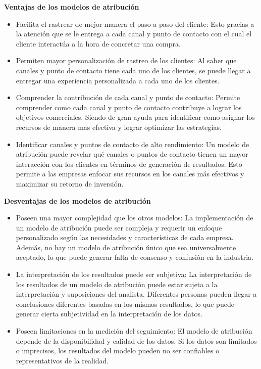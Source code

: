 \textbf{Ventajas de los modelos de atribución}

\begin{itemize}
\item Facilita el rastrear de mejor manera el paso a paso del cliente: Esto gracias a la atención que se le entrega a cada canal y punto de contacto con el cual el cliente interactúa a la hora de concretar una compra.
\item Permiten mayor personalización de rastreo de los clientes: Al saber que canales y punto de contacto tiene cada uno de los clientes, se puede llegar a entregar una experiencia personalizada a cada uno de los clientes.
\item Comprender la contribución de cada canal y punto de contacto: Permite comprender como cada canal y punto de contacto contribuye a lograr los objetivos comerciales. Siendo de gran ayuda para identificar como asignar los recursos de manera mas efectiva y lograr optimizar las estrategias.
\item Identificar canales y puntos de contacto de alto rendimiento: Un modelo de atribución puede revelar qué canales o puntos de contacto tienen un mayor interacción con los clientes en términos de generación de resultados. Esto permite a las empresas enfocar sus recursos en los canales más efectivos y maximizar su retorno de inversión.
\end{itemize}

\textbf{Desventajas de los modelos de atribución}

\begin{itemize}
\item Poseen una mayor complejidad que los otros modelos: La implementación de un modelo de atribución puede ser compleja y requerir un enfoque personalizado según las necesidades y características de cada empresa. Además, no hay un modelo de atribución único que sea universalmente aceptado, lo que puede generar falta de consenso y confusión en la industria.
\item La interpretación de los resultados puede ser subjetiva: La interpretación de los resultados de un modelo de atribución puede estar sujeta a la interpretación y suposiciones del analista. Diferentes personas pueden llegar a conclusiones diferentes basadas en los mismos resultados, lo que puede generar cierta subjetividad en la interpretación de los datos.
\item Poseen limitaciones en la medición del seguimiento: El modelo de atribución depende de la disponibilidad y calidad de los datos. Si los datos son limitados o imprecisos, los resultados del modelo pueden no ser confiables o representativos de la realidad.
\end{itemize}